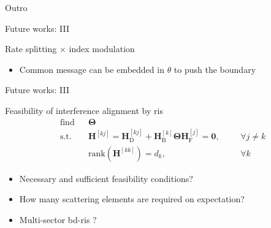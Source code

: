 \documentclass[presentation,xcolor={table},9pt]{beamer}
\begin{document}
\begin{section}{Outro}
\begin{frame}{Future works: III}
\begin{block}{Rate splitting $\times$ index modulation}
\begin{itemize}
\begin{figure}
{{						}
					}
				\end{figure}
				\item Common message can be embedded in $\theta$ to push the boundary
			\end{itemize}
		\end{block}
	\end{frame}

	\begin{frame}{Future works: III}
		\begin{block}{Feasibility of interference alignment by \gls{ris}}
			\begin{align*}
				&\text{find} && \mathbf{\Theta} &&&\\
				&\text{s.t.} && \mathbf{H}^{[kj]} = \mathbf{H}_\mathrm{D}^{[kj]} + \mathbf{H}_\mathrm{B}^{[k]} \mathbf{\Theta} \mathbf{H}_\mathrm{F}^{[j]} = \mathbf{0}, &&& \forall j \neq k\\
				& && \mathrm{rank}(\mathbf{H}^{[kk]}) = d_k, &&& \forall k
			\end{align*}
			\begin{itemize}
				\item Necessary and sufficient feasibility conditions?
				\item How many scattering elements are required on expectation?
				\item Multi-sector \gls{bd}-\gls{ris} \cite{Li2023c}?
			\end{itemize}
		\end{block}
	\end{frame}

\end{section}
\end{document}
